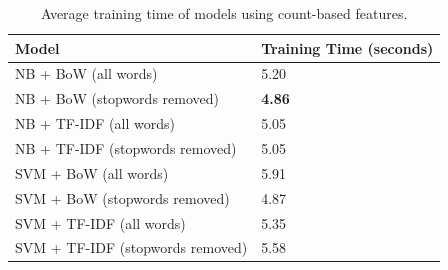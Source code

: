 \documentclass[a4paper,twoside,phd]{BYUPhys}
\begin{document}
\begin{table}[H]
	\centering
	
	\begin{tabular}{|p{4.2cm}|p{5cm}|}
		\hline
		
		\textbf{Model} & \textbf{Training Time (seconds)}                                                                                                                                                                                                                                                                                                                                                    \\
		\hline                                                                                                                                              
		
		NB + BoW (all words)  & 5.20  \\
		\hline
		
		NB + BoW \newline (stopwords  removed)  & \textbf{4.86}  \\
		\hline
		
		NB + TF-IDF \newline (all words) & 5.05 \\
		\hline
		
		NB + TF-IDF \newline (stopwords removed) & 5.05 \\
		\hline
		
		SVM + BoW  \newline (all words)  & 5.91  \\
		\hline
		
		SVM + BoW \newline (stopwords removed)  & 4.87  \\
		\hline
		
		SVM + TF-IDF \newline (all words) & 5.35 \\
		\hline
		
		SVM + TF-IDF \newline (stopwords removed) & 5.58 \\
		\hline                                                                                                                                           
		
	\end{tabular}
	\caption{Average training time of models using count-based features.}
	\label{table:CountTrainingTime}
\end{table}
\end{document}
